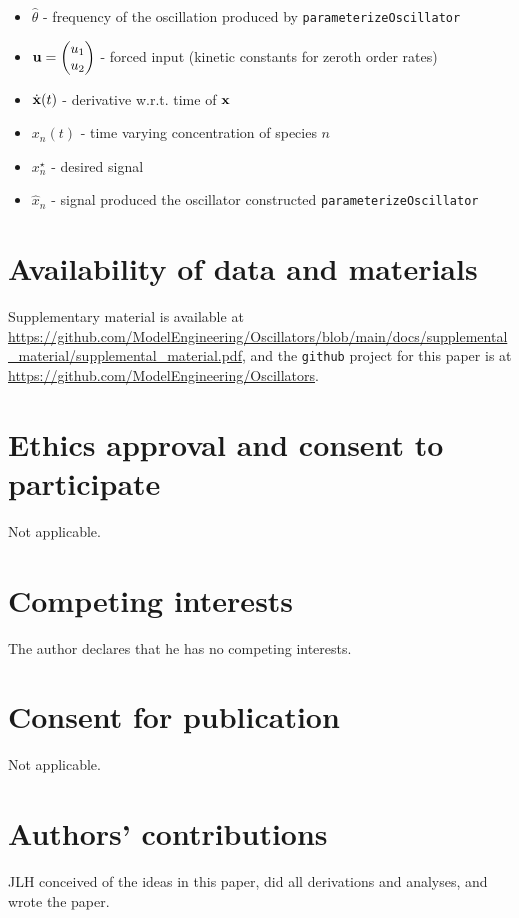 \documentclass{bmcart}
\begin{document}
\begin{backmatter}
\begin{itemize}
\item $\hat{\theta}$ - frequency of the oscillation produced by {\tt parameterizeOscillator}
\item ${\bf u} = \begin{pmatrix} u_1 \\ u_2 \end{pmatrix}$ - forced input (kinetic constants for zeroth order
rates)
\item $\dot{\bf x} (t)$ - derivative w.r.t. time of ${\bf x}$
\item $x_n(t)$
 - time varying concentration of species $n$
\item $x_n^{\star}$ - desired signal
\item $\hat{x}_n$ - signal produced the oscillator constructed {\tt parameterizeOscillator}
\end{itemize}



\section*{Availability of data and materials}%
Supplementary material is available at
\url{https://github.com/ModelEngineering/Oscillators/blob/main/docs/supplemental_material/supplemental_material.pdf}, and the {\tt github} project for this paper is at
\url{https://github.com/ModelEngineering/Oscillators}.


\section*{Ethics approval and consent to participate}
Not applicable.

\section*{Competing interests}
The author declares that he has no competing interests.

\section*{Consent for publication}%
Not applicable.

\section*{Authors' contributions}
JLH conceived of the ideas in this paper, did all derivations and analyses, and wrote the paper.




\end{backmatter}
\end{document}
